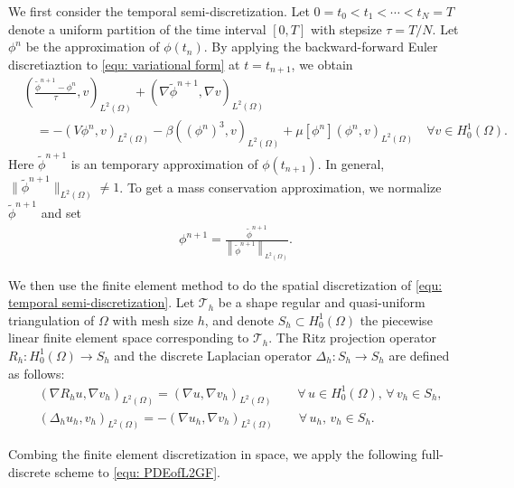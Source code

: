 \documentclass{siamart250211}
\def\nn{\nonumber}
\begin{document}
We first consider the temporal semi-discretization. Let $0 = t_0 < t_1 < \cdots < t_N = T$ denote a uniform partition of the time interval $[0,T]$ with stepsize $\tau = T/N$. Let $\phi^n$ be the approximation of $\phi(t_n)$. By applying the backward-forward Euler discretiaztion to \eqref{equ: variational form} at $t = t_{n+1}$, we obtain
\begin{align}
    & \left( \frac{\tilde{\phi}^{n+1} - \phi^n}{\tau}, v \right)_{L^2(\Omega)} + (\nabla \tilde{\phi}^{n+1}, \nabla v)_{L^2(\Omega)} \nn \\
    & \quad = - (V\phi^n,v)_{L^2(\Omega)} - \beta((\phi^n)^3,v)_{L^2(\Omega)} + \mu[\phi^n](\phi^n,v)_{L^2(\Omega)} \quad \forall v \in H_0^1(\Omega). \label{equ: temporal semi-discretization}
\end{align}
Here $\tilde{\phi}^{n+1}$ is an temporary approximation of $\phi(t_{n+1})$. In general, $\|\tilde{\phi}^{n+1}\|_{L^2(\Omega)} \neq 1$. To get a mass conservation approximation, we normalize $\tilde{\phi}^{n+1}$ and set
\begin{align*}
    \phi^{n+1}   = \frac{ \tilde{\phi}^{n+1}  }{\left\| \tilde{\phi}^{n+1}  \right\|_{L^2(\Omega)}}.
\end{align*}

We then use the finite element method to do the spatial discretization of \eqref{equ: temporal semi-discretization}. Let $\mathcal{T}_h$ be a shape regular and quasi-uniform triangulation of $\Omega$ with mesh size $h$, and denote $S_h \subset H_0^1(\Omega)$ the piecewise linear finite element space corresponding to $\mathcal{T}_h$. The Ritz projection operator $R_h:H_0^1(\Omega) \to S_h$ and the discrete Laplacian operator $\Delta_h: S_h \to S_h$ are defined as follows:
\begin{align*}
	& (\nabla R_h u, \nabla v_h)_{L^2(\Omega)} = (\nabla  u, \nabla v_h)_{L^2(\Omega)} \qquad \forall\, u \in H_0^1(\Omega), \, \forall\, v_h \in S_h, \\
	& (\Delta_h u_h, v_h)_{L^2(\Omega)} = - (\nabla  u_h, \nabla v_h)_{L^2(\Omega)} \qquad \forall\, u_h, \, v_h \in S_h.
\end{align*}

Combing the finite element discretization in space, we apply the following full-discrete scheme to \eqref{equ: PDEofL2GF}. 
\end{document}
